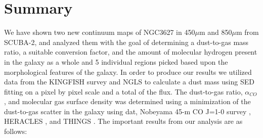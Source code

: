 \chapter{Summary}

We have shown two new continuum maps of NGC3627 in 450$\mu$m and 850$\mu$m from SCUBA-2, and analyzed them with the goal of determining a dust-to-gas mass ratio, a suitable conversion factor, and the amount of molecular hydrogen present in the galaxy as a whole and 5 individual regions picked based upon the morphological features of the galaxy.  In order to produce our results we utilized data from the KINGFISH survey \citep{kennicutt2011} and NGLS \citep{wilson2012} to calculate a dust mass using SED fitting on a pixel by pixel scale and a total of the flux.  The dust-to-gas ratio, $\alpha_{CO}$, and molecular gas surface density was determined using a minimization of the dust-to-gas scatter in the galaxy using dat, Nobeyama 45-m CO J=1-0 survey \citep{kuno2007}, HERACLES \citep{reuter1996}, and THINGS \citep{walter2008}.  The important results from our analysis are as follows:

